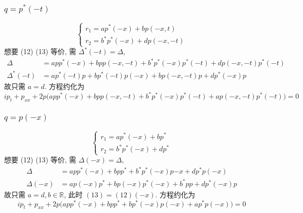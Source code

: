 \subsubsection{$q = p^{*}(-t)$}
\begin{equation*}
    \begin{cases}
        r_1 = ap^{*}(-x) + bp(-x,t) \\
        r_2 = b^{*}p^{*}(-x) + dp(-x,-t) 
    \end{cases}
\end{equation*}
想要 (12) (13) 等价, 需 $ \Delta^{*}(-t) = \Delta $,
\begin{equation*}
    \begin{aligned}
        \Delta &= app^{*}(-x) + bpp(-x,-t) + b^{*}p^{*}(-x)p^{*}(-t) + dp(-x,-t)p^{*}(-t) \\
        \Delta^{*}(-t) &= ap^{*}(-t)p + bp^{*}(-t)p(-x) + bp(-x,-t)p + dp^{*}(-x)p   
    \end{aligned}
\end{equation*}
故只需 $ a = d $. 方程约化为
\begin{equation*}
    ip_t + p_{xx} + 2p \big( app^{*}(-x) + bpp(-x,-t) + b^{*}p^{*}(-x)p^{*}(-t) + ap(-x,-t)p^{*}(-t) \big) = 0
\end{equation*}

\subsubsection{$ q = p(-x) $}
\begin{equation*}
    \begin{cases}
        r_1 = ap^{*}(-x) + bp^{*} \\
        r_2 = b^{*}p^{*}(-x) + dp^{*} 
    \end{cases}
\end{equation*}
想要 (12) (13) 等价, 需 $ \Delta(-x) = \Delta $,
\begin{equation*}
    \begin{aligned}
        \Delta &= app^{*}(-x) + bpp^{*} + b^{*}p^{*}(-x)p{-x} + dp^{*}p(-x) \\
        \Delta(-x) &= ap(-x)p^{*} + bp(-x)p^{*}(-x) + b^{*}pp + dp^{*}(-x)p   
    \end{aligned}
\end{equation*}
故只需 $ a = d, b\in \mathbb{R}$, 此时 $ (13) = (12)(-x) $. 方程约化为
\begin{equation*}
    ip_t + p_{xx} + 2p \big( app^{*}(-x) + bpp^{*} + bp^{*}(-x)p(-x) + ap^{*}p(-x) \big) = 0
\end{equation*}

